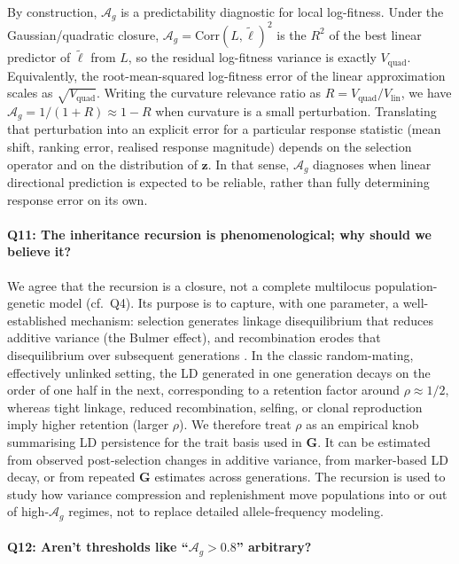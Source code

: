 \documentclass[9pt,twocolumn,twoside,lineno]{gsajnl}
\newcommand{\vect}[1]{\boldsymbol{#1}}
\newcommand{\mat}[1]{\mathbf{#1}}
\newcommand{\Ag}{\ensuremath{\mathcal{A}_{g}}\xspace}
\begin{document}
By construction, $\Ag$ is a predictability diagnostic for local log-fitness. Under the Gaussian/quadratic closure, $\Ag=\mathrm{Corr}(L,\tilde{\ell})^2$ is the $R^2$ of the best linear predictor of $\tilde{\ell}$ from $L$, so the residual log-fitness variance is exactly $V_{\mathrm{quad}}$. Equivalently, the root-mean-squared log-fitness error of the linear approximation scales as $\sqrt{V_{\mathrm{quad}}}$. Writing the curvature relevance ratio as $R=V_{\mathrm{quad}}/V_{\mathrm{lin}}$, we have $\Ag=1/(1+R)\approx 1-R$ when curvature is a small perturbation. Translating that perturbation into an explicit error for a particular response statistic (mean shift, ranking error, realised response magnitude) depends on the selection operator and on the distribution of $\vect{z}$. In that sense, $\Ag$ diagnoses when linear directional prediction is expected to be reliable, rather than fully determining response error on its own.

\paragraph{Q11: The inheritance recursion is phenomenological; why should we believe it?}

We agree that the recursion is a closure, not a complete multilocus population-genetic model (cf.\ Q4). Its purpose is to capture, with one parameter, a well-established mechanism: selection generates linkage disequilibrium that reduces additive variance (the Bulmer effect), and recombination erodes that disequilibrium over subsequent generations \citep{Bulmer1971}. In the classic random-mating, effectively unlinked setting, the LD generated in one generation decays on the order of one half in the next, corresponding to a retention factor around $\rho\approx 1/2$, whereas tight linkage, reduced recombination, selfing, or clonal reproduction imply higher retention (larger $\rho$). We therefore treat $\rho$ as an empirical knob summarising LD persistence for the trait basis used in $\mat{G}$. It can be estimated from observed post-selection changes in additive variance, from marker-based LD decay, or from repeated $\mat{G}$ estimates across generations. The recursion is used to study how variance compression and replenishment move populations into or out of high-\Ag regimes, not to replace detailed allele-frequency modeling.

\paragraph{Q12: Aren't thresholds like ``$\mathcal{A}_g>0.8$'' arbitrary?}
\end{document}
